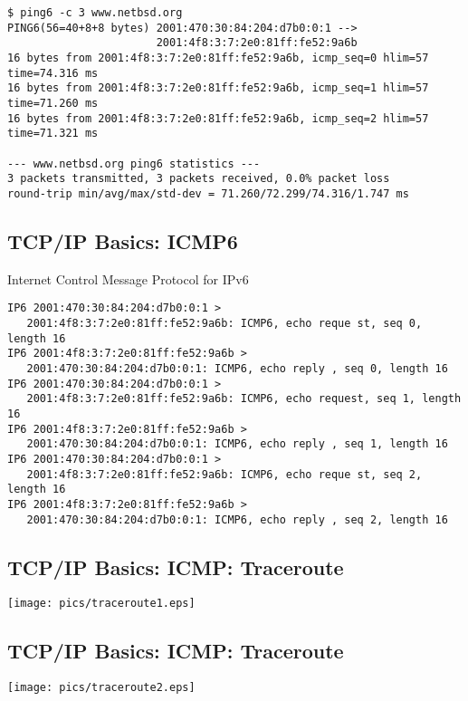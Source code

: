 \documentclass[xga]{xdvislides}
\begin{document}
\begin{verbatim}
$ ping6 -c 3 www.netbsd.org
PING6(56=40+8+8 bytes) 2001:470:30:84:204:d7b0:0:1 -->
                       2001:4f8:3:7:2e0:81ff:fe52:9a6b
16 bytes from 2001:4f8:3:7:2e0:81ff:fe52:9a6b, icmp_seq=0 hlim=57 time=74.316 ms
16 bytes from 2001:4f8:3:7:2e0:81ff:fe52:9a6b, icmp_seq=1 hlim=57 time=71.260 ms
16 bytes from 2001:4f8:3:7:2e0:81ff:fe52:9a6b, icmp_seq=2 hlim=57 time=71.321 ms

--- www.netbsd.org ping6 statistics ---
3 packets transmitted, 3 packets received, 0.0% packet loss
round-trip min/avg/max/std-dev = 71.260/72.299/74.316/1.747 ms
\end{verbatim}

\subsection{TCP/IP Basics: ICMP6}
\begin{center}
Internet Control Message Protocol for IPv6
\end{center}
\vspace{.2in}

\begin{verbatim}
IP6 2001:470:30:84:204:d7b0:0:1 >
   2001:4f8:3:7:2e0:81ff:fe52:9a6b: ICMP6, echo reque st, seq 0, length 16
IP6 2001:4f8:3:7:2e0:81ff:fe52:9a6b >
   2001:470:30:84:204:d7b0:0:1: ICMP6, echo reply , seq 0, length 16
IP6 2001:470:30:84:204:d7b0:0:1 >
   2001:4f8:3:7:2e0:81ff:fe52:9a6b: ICMP6, echo request, seq 1, length 16
IP6 2001:4f8:3:7:2e0:81ff:fe52:9a6b >
   2001:470:30:84:204:d7b0:0:1: ICMP6, echo reply , seq 1, length 16
IP6 2001:470:30:84:204:d7b0:0:1 >
   2001:4f8:3:7:2e0:81ff:fe52:9a6b: ICMP6, echo reque st, seq 2, length 16
IP6 2001:4f8:3:7:2e0:81ff:fe52:9a6b >
   2001:470:30:84:204:d7b0:0:1: ICMP6, echo reply , seq 2, length 16
\end{verbatim}

\subsection{TCP/IP Basics: ICMP: Traceroute}
\vspace*{\fill}
\begin{center}
	\texttt{[image: pics/traceroute1.eps]}
\end{center}
\vspace*{\fill}

\subsection{TCP/IP Basics: ICMP: Traceroute}
\vspace*{\fill}
\begin{center}
	\texttt{[image: pics/traceroute2.eps]}
\end{center}
\vspace*{\fill}
\end{document}
